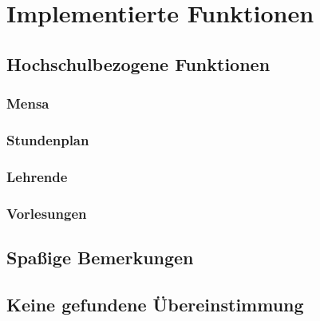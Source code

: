 \chapter{Implementierte Funktionen}
\section{Hochschulbezogene Funktionen}
\subsection{Mensa}
\subsection{Stundenplan}
\subsection{Lehrende}
\subsection{Vorlesungen}
\section{Spaßige Bemerkungen}
\section{Keine gefundene Übereinstimmung}
